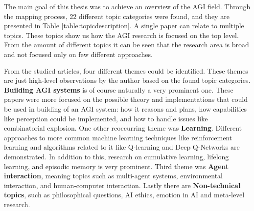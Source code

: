 \documentclass[utf8,english]{gradu3}
\begin{document}
The main goal of this thesis was to achieve an overview of the AGI field.
Through the mapping process, 22 different topic categories were found, and they
are presented in Table \ref{table:topicdescription}. A single paper can relate
to multiple topics. These topics show us how the AGI research is focused on the
top level. From the amount of different topics it can be seen that the research
area is broad and not focused only on few different approaches. 

From the studied articles, four different themes could be identified. These
themes are just high-level observations by the author based on the found topic
categories. \textbf{Building AGI systems} is of course naturally a very
prominent one. These papers were more focused on the possible theory and
implementations that could be used in building of an AGI system: how it reasons
and plans, how capabilities like perception could be implemented, and how to
handle issues like combinatorial explosion. One other reoccurring theme was
\textbf{Learning}. Different approaches to more common machine learning
techniques like reinforcement learning and algorithms related to it like
Q-learning and Deep Q-Networks are demonstrated. In addition to this, research
on cumulative learning, lifelong learning, and episodic memory is very
prominent. Third theme was \textbf{Agent interaction}, meaning topics such as
multi-agent systems, environmental interaction, and human-computer interaction.
Lastly there are \textbf{Non-technical topics}, such as philosophical
questions, AI ethics, emotion in AI and meta-level research.
\end{document}
